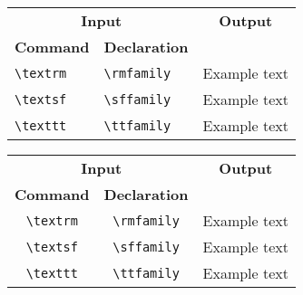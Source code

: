 \documentclass{article}
\newcommand{\head}[1]{\textnormal{\textbf{#1}}}
\begin{document}
\begin{tabular}{@{}*3l@{}}
  \toprule[1.5pt]
  \multicolumn{2}{c}{\head{Input}} & \multicolumn{1}{c}{\head{Output}}\\
  \head{Command} & \head{Declaration} & \\
  \cmidrule(r){1-2}\cmidrule(l){3-3}
  
  \verb|\textrm| & \verb|\rmfamily| & \rmfamily Example text \\
  \verb|\textsf| & \verb|\sffamily| & \sffamily Example text \\
  \verb|\texttt| & \verb|\ttfamily| & \ttfamily Example text \\
  \bottomrule[1.5pt]
\end{tabular}


\begin{tabular}{@{}*3c@{}}
  \toprule[1.5pt]
  \multicolumn{2}{c}{\head{Input}} & \multicolumn{1}{c}{\head{Output}}\\
  \head{Command} & \head{Declaration} & \\
  \cmidrule(r){1-2}\cmidrule(l){3-3}
  
  \verb|\textrm| & \verb|\rmfamily| & \rmfamily Example text \\
  \verb|\textsf| & \verb|\sffamily| & \sffamily Example text \\
  \verb|\texttt| & \verb|\ttfamily| & \ttfamily Example text \\
  \bottomrule[1.5pt]
\end{tabular}
\end{document}
